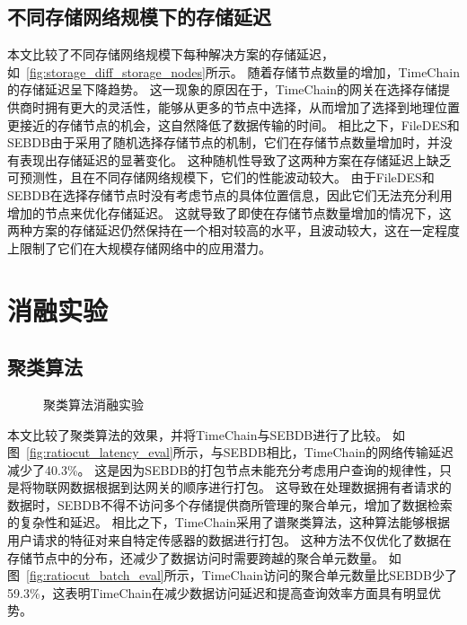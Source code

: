 \subsection{不同存储网络规模下的存储延迟}
本文比较了不同存储网络规模下每种解决方案的存储延迟，如~\autoref{fig:storage_diff_storage_nodes}所示。
随着存储节点数量的增加，TimeChain的存储延迟呈下降趋势。
这一现象的原因在于，TimeChain的网关在选择存储提供商时拥有更大的灵活性，能够从更多的节点中选择，从而增加了选择到地理位置更接近的存储节点的机会，这自然降低了数据传输的时间。
相比之下，FileDES和SEBDB由于采用了随机选择存储节点的机制，它们在存储节点数量增加时，并没有表现出存储延迟的显著变化。
这种随机性导致了这两种方案在存储延迟上缺乏可预测性，且在不同存储网络规模下，它们的性能波动较大。
由于FileDES和SEBDB在选择存储节点时没有考虑节点的具体位置信息，因此它们无法充分利用增加的节点来优化存储延迟。
这就导致了即使在存储节点数量增加的情况下，这两种方案的存储延迟仍然保持在一个相对较高的水平，且波动较大，这在一定程度上限制了它们在大规模存储网络中的应用潜力。

\section{消融实验}
\subsection{聚类算法}
\begin{figure*}[t]
    \centering
	\begin{minipage}{0.9\linewidth}
        \quad
        \caption{聚类算法消融实验} 
    \end{minipage}
\end{figure*}

本文比较了聚类算法的效果，并将TimeChain与SEBDB进行了比较。
如图~\autoref{fig:ratiocut_latency_eval}所示，与SEBDB相比，TimeChain的网络传输延迟减少了40.3\%。
这是因为SEBDB的打包节点未能充分考虑用户查询的规律性，只是将物联网数据根据到达网关的顺序进行打包。
这导致在处理数据拥有者请求的数据时，SEBDB不得不访问多个存储提供商所管理的聚合单元，增加了数据检索的复杂性和延迟。
相比之下，TimeChain采用了谱聚类算法，这种算法能够根据用户请求的特征对来自特定传感器的数据进行打包。
这种方法不仅优化了数据在存储节点中的分布，还减少了数据访问时需要跨越的聚合单元数量。
如图~\autoref{fig:ratiocut_batch_eval}所示，TimeChain访问的聚合单元数量比SEBDB少了59.3\%，这表明TimeChain在减少数据访问延迟和提高查询效率方面具有明显优势。

